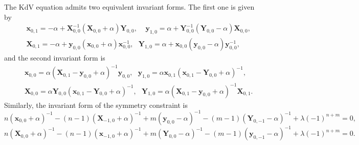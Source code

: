\documentclass[dvips,10pt]{article}
\newcommand{\bs}{\boldsymbol}
\theoremstyle{remark} %
\begin{document}
The KdV equation admits two equivalent invariant forms. The first one is given by
		\begin{eqnarray*}
			&& {\bs{x}}_{0,1} = -\alpha + {\bs{X}}_{0,0}^{-1} ({\bs{X}}_{0,0}+\alpha) {\bs{Y}}_{0,0}, ~~~~~{\bs{y}}_{1,0} = \alpha + {\bs{Y}}_{0,0}^{-1} ({\bs{Y}}_{0,0}-\alpha) {\bs{X}}_{0,0}, \\
			&&   {\bs{X}}_{0,1} =  -\alpha + {\bs{y}}_{0,0} ({\bs{x}}_{0,0}+\alpha) {\bs{x}}_{0,0}^{-1}, ~~~ {\bs{Y}}_{1,0} = \alpha + {\bs{x}}_{0,0} ({\bs{y}}_{0,0}-\alpha) {\bs{y}}_{0,0}^{-1},
		\end{eqnarray*}
	and the second invariant form is
		\begin{eqnarray*}
			&& {\bs{x}}_{0,0} = \alpha \left({\bs{X}}_{0,1}- {\bs{y}}_{0,0}+\alpha\right)^{-1} {\bs{y}}_{0,0}, ~~~{\bs{y}}_{1,0} = \alpha {\bs{x}}_{0,1} ({\bs{x}}_{0,1}- {\bs{Y}}_{0,0}+\alpha)^{-1}, \\
			&& {\bs{X}}_{0,0} = \alpha {\bs{Y}}_{0,0} ({\bs{x}}_{0,1}-{\bs{Y}}_{0,0}+\alpha)^{-1}, ~~~ {\bs{Y}}_{1,0} =\alpha ({\bs{X}}_{0,1}- {\bs{y}}_{0,0}+\alpha)^{-1} {\bs{X}}_{0,1}.
		\end{eqnarray*}
	Similarly, the invariant form of the symmetry constraint is
	\begin{equation*} 
		n ({\bs{x}}_{0,0}+\alpha)^{-1} - (n-1) ({\bs{X}}_{-1,0}+\alpha)^{-1} + m ({\bs{y}}_{0,0}-\alpha)^{-1} - (m-1) ({\bs{Y}}_{0,-1}-\alpha)^{-1} + \lambda (-1)^{n+m}= 0,
	\end{equation*}
	\begin{equation*} 
		n ({\bs{X}}_{0,0}+\alpha)^{-1} - (n-1) ({\bs{x}}_{-1,0}+\alpha)^{-1} + m ({\bs{Y}}_{0,0}-\alpha)^{-1} - (m-1) ({\bs{y}}_{0,-1}-\alpha)^{-1} + \lambda (-1)^{n+m}= 0.
	\end{equation*}
	
\end{document}
